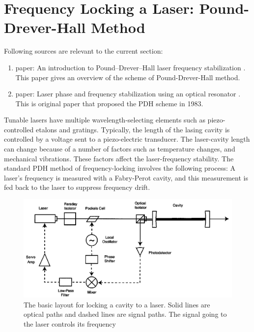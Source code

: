 \documentclass[12pt,A4Paper]{article}
\begin{document}
\section{Frequency Locking a Laser: Pound-Drever-Hall Method}
Following sources are relevant to the current section: 
\begin{enumerate}
    \item paper: An introduction to Pound–Drever–Hall laser frequency stabilization \cite{PDHintro}. This paper gives an overview of the scheme of Pound-Drever-Hall method. 
    \item paper: Laser phase and frequency stabilization using an optical resonator \cite{PDH1983}. This is original paper that proposed the PDH scheme in 1983. 
\end{enumerate}

Tunable lasers have multiple wavelength-selecting elements such as piezo-controlled etalons and gratings. Typically, the length of the lasing cavity is controlled by a voltage sent to a piezo-electric transducer. The laser-cavity length can change because of a number of factors such as temperature changes, and mechanical vibrations. These factors affect the laser-frequency stability. The standard PDH method of frequency-locking involves the following process: A laser's frequency is measured with a Fabry-Perot cavity, and this measurement is fed back to the laser to suppress frequency drift. \cite{PDH1983}\cite{PDHintro}
\par
\begin{figure}[H]
    \centering
    \includegraphics[width=.8\textwidth]{PDHlayout.png}
    \caption{The basic layout for locking a cavity to a laser. Solid lines are optical paths and dashed lines are signal paths. The signal going to the laser controls its frequency \cite{PDHintro}}
    \label{fig:PDHlayout}
\end{figure}
\end{document}
